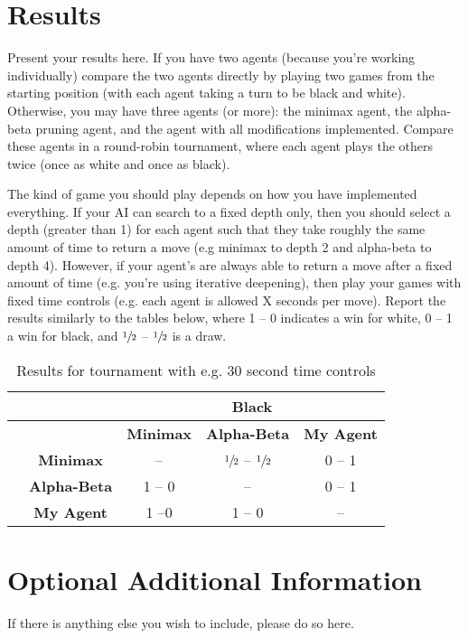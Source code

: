 \documentclass[twocolumn]{article}
\begin{document}
\section{Results}

Present your results here. If you have two agents (because you're working individually) compare the two agents directly by playing two games from the starting position (with each agent taking a turn to be black and white).
Otherwise, you may have three agents (or more): the minimax agent, the alpha-beta pruning agent, and the agent with all modifications implemented. Compare these agents in a round-robin tournament, where each agent plays the others twice (once as white and once as black). 

The kind of game you should play depends on how you have implemented everything. If your AI can search to a fixed depth only, then you should select a depth (greater than 1) for each agent such that they take roughly the same amount of time to return a move (e.g minimax to depth 2 and alpha-beta to depth 4). However, if your agent's are always able to return a move after a fixed amount of time (e.g. you're using iterative deepening), then play your games with fixed time controls (e.g. each agent is allowed X seconds per move). Report the results similarly to the tables below, where 1 -- 0 indicates a win for white, 0 -- 1 a win for black, and $\sfrac{1}{2}$ -- $\sfrac{1}{2}$ is a draw.

\begin{table}[h!]
\centering
\begin{tabular}{|c|c|c|c|c|}
\hline
                       &                     & \multicolumn{3}{c|}{Black}                                           \\ \hline
                       &                     & \textbf{Minimax} & \textbf{Alpha-Beta}           & \textbf{My Agent} \\ \hline
\parbox[t]{2mm}{} & \textbf{Minimax}    & --                & $\sfrac{1}{2}$ -- $\sfrac{1}{2}$ & 0 -- 1               \\  
                       & \textbf{Alpha-Beta} & 1 -- 0              & --                             & 0 -- 1               \\  
                       & \textbf{My Agent}   & 1 --0              & 1 -- 0                           & --                 \\ \hline
\end{tabular}
\caption{Results for tournament with e.g. 30 second time controls}
\end{table}


\section{Optional Additional Information}

If there is anything else you wish to include, please do so here.
\end{document}
